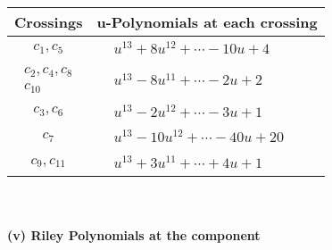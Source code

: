 \documentclass[1p]{elsarticle_modified}
\theoremstyle{definition}
\begin{document}
\begin{tabular}{m{50pt}|m{274pt}}
Crossings & \hspace{64pt}u-Polynomials at each crossing \\
\hline $$\begin{aligned}c_{1},c_{5}\end{aligned}$$&$\begin{aligned}
&u^{13}+8 u^{12}+\cdots-10 u+4
\end{aligned}$\\
\hline $$\begin{aligned}c_{2},c_{4},c_{8}\\c_{10}\end{aligned}$$&$\begin{aligned}
&u^{13}-8 u^{11}+\cdots-2 u+2
\end{aligned}$\\
\hline $$\begin{aligned}c_{3},c_{6}\end{aligned}$$&$\begin{aligned}
&u^{13}-2 u^{12}+\cdots-3 u+1
\end{aligned}$\\
\hline $$\begin{aligned}c_{7}\end{aligned}$$&$\begin{aligned}
&u^{13}-10 u^{12}+\cdots-40 u+20
\end{aligned}$\\
\hline $$\begin{aligned}c_{9},c_{11}\end{aligned}$$&$\begin{aligned}
&u^{13}+3 u^{11}+\cdots+4 u+1
\end{aligned}$\\
\hline
\end{tabular}\\~\\
\newpage\renewcommand{\arraystretch}{1}
\flushleft \textbf{(v) Riley Polynomials at the component}\newline \\
\end{document}
